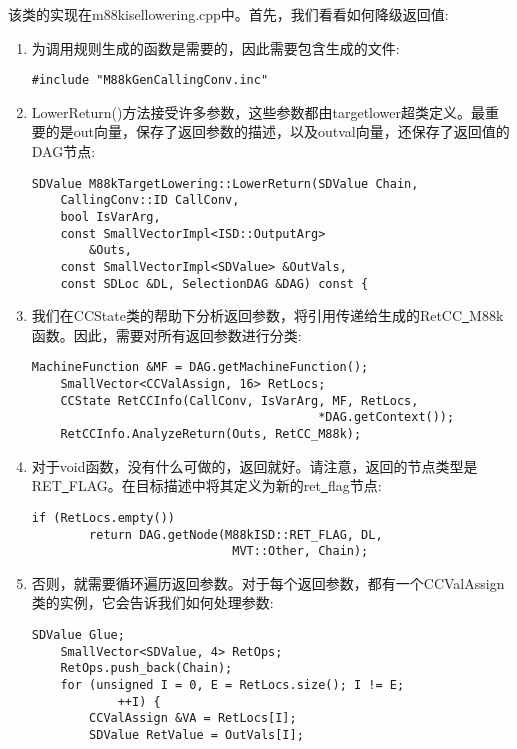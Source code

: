 该类的实现在m88kisellowering.cpp中。首先，我们看看如何降级返回值:\par

\begin{enumerate}
\item 为调用规则生成的函数是需要的，因此需要包含生成的文件:
\begin{lstlisting}[caption={}]
#include "M88kGenCallingConv.inc"
\end{lstlisting}

\item LowerReturn()方法接受许多参数，这些参数都由targetlower超类定义。最重要的是out向量，保存了返回参数的描述，以及outval向量，还保存了返回值的DAG节点:
\begin{lstlisting}[caption={}]
SDValue M88kTargetLowering::LowerReturn(SDValue Chain,
	CallingConv::ID CallConv,
	bool IsVarArg,
	const SmallVectorImpl<ISD::OutputArg>
		&Outs,
	const SmallVectorImpl<SDValue> &OutVals,
	const SDLoc &DL, SelectionDAG &DAG) const {
\end{lstlisting}

\item 我们在CCState类的帮助下分析返回参数，将引用传递给生成的RetCC\underline{~}M88k函数。因此，需要对所有返回参数进行分类:
\begin{lstlisting}[caption={}]
	MachineFunction &MF = DAG.getMachineFunction();
	SmallVector<CCValAssign, 16> RetLocs;
	CCState RetCCInfo(CallConv, IsVarArg, MF, RetLocs,
										*DAG.getContext());
	RetCCInfo.AnalyzeReturn(Outs, RetCC_M88k);
\end{lstlisting}

\item 对于void函数，没有什么可做的，返回就好。请注意，返回的节点类型是RET\underline{~}FLAG。在目标描述中将其定义为新的ret\underline{~}flag节点:
\begin{lstlisting}[caption={}]
	if (RetLocs.empty())
		return DAG.getNode(M88kISD::RET_FLAG, DL,
							MVT::Other, Chain);
\end{lstlisting}

\item 否则，就需要循环遍历返回参数。对于每个返回参数，都有一个CCValAssign类的实例，它会告诉我们如何处理参数:
\begin{lstlisting}[caption={}]
	SDValue Glue;
	SmallVector<SDValue, 4> RetOps;
	RetOps.push_back(Chain);
	for (unsigned I = 0, E = RetLocs.size(); I != E;
			++I) {
		CCValAssign &VA = RetLocs[I];
		SDValue RetValue = OutVals[I];
\end{lstlisting}


\end{enumerate}
